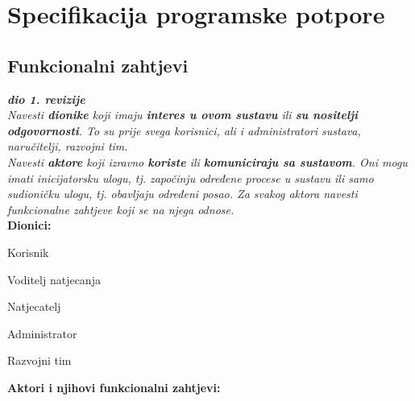 \chapter{Specifikacija programske potpore}
		
		
\section{Funkcionalni zahtjevi}

\textbf{\textit{dio 1. revizije}}\\

\textit{Navesti \textbf{dionike} koji imaju \textbf{interes u ovom sustavu} ili  \textbf{su nositelji odgovornosti}. To su prije svega korisnici, ali i administratori sustava, naručitelji, razvojni tim.}\\

\textit{Navesti \textbf{aktore} koji izravno \textbf{koriste} ili \textbf{komuniciraju sa sustavom}. Oni mogu imati inicijatorsku ulogu, tj. započinju određene procese u sustavu ili samo sudioničku ulogu, tj. obavljaju određeni posao. Za svakog aktora navesti funkcionalne zahtjeve koji se na njega odnose.}\\


\noindent \textbf{Dionici:}

\begin{packed_enum}
	\item Korisnik
	\item Voditelj natjecanja
	\item Natjecatelj				
	\item Administrator
	\item Razvojni tim
	
\end{packed_enum}

\noindent \textbf{Aktori i njihovi funkcionalni zahtjevi:}


